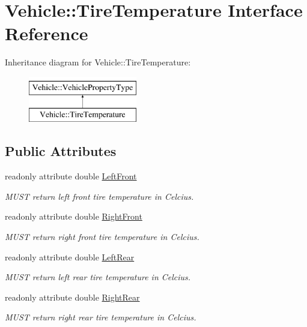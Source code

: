 \hypertarget{interfaceVehicle_1_1TireTemperature}{\section{Vehicle\-:\-:Tire\-Temperature Interface Reference}
\label{interfaceVehicle_1_1TireTemperature}
}
Inheritance diagram for Vehicle\-:\-:Tire\-Temperature\-:\begin{figure}[H]
\begin{center}
\leavevmode
\includegraphics[height=2.000000cm]{interfaceVehicle_1_1TireTemperature}
\end{center}
\end{figure}
\subsection*{Public Attributes}
\begin{DoxyCompactItemize}
\item 
readonly attribute double \hyperlink{interfaceVehicle_1_1TireTemperature_a4c0e69fc83f633be2c10adac5d476ec1}{Left\-Front}
\begin{DoxyCompactList}\small\item\em M\-U\-S\-T return left front tire temperature in Celcius. \end{DoxyCompactList}\item 
readonly attribute double \hyperlink{interfaceVehicle_1_1TireTemperature_a31c1212ad03870867815c06204abcec0}{Right\-Front}
\begin{DoxyCompactList}\small\item\em M\-U\-S\-T return right front tire temperature in Celcius. \end{DoxyCompactList}\item 
readonly attribute double \hyperlink{interfaceVehicle_1_1TireTemperature_a7ff76f8b41420cc7f079b390d12a7bc5}{Left\-Rear}
\begin{DoxyCompactList}\small\item\em M\-U\-S\-T return left rear tire temperature in Celcius. \end{DoxyCompactList}\item 
readonly attribute double \hyperlink{interfaceVehicle_1_1TireTemperature_a93b9ac302c47e510aa8c3a14687f6bf6}{Right\-Rear}
\begin{DoxyCompactList}\small\item\em M\-U\-S\-T return right rear tire temperature in Celcius. \end{DoxyCompactList}\end{DoxyCompactItemize}
